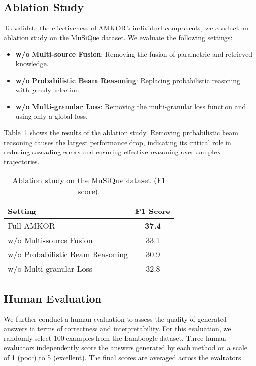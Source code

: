 \subsection{Ablation Study}

To validate the effectiveness of AMKOR's individual components, we conduct an ablation study on the MuSiQue dataset. We evaluate the following settings:
\begin{itemize}
    \item \textbf{w/o Multi-source Fusion}: Removing the fusion of parametric and retrieved knowledge.
    \item \textbf{w/o Probabilistic Beam Reasoning}: Replacing probabilistic reasoning with greedy selection.
    \item \textbf{w/o Multi-granular Loss}: Removing the multi-granular loss function and using only a global loss.
\end{itemize}

Table~\ref{tab:ablation} shows the results of the ablation study. Removing probabilistic beam reasoning causes the largest performance drop, indicating its critical role in reducing cascading errors and ensuring effective reasoning over complex trajectories.

\begin{table}[ht]
\centering
\caption{Ablation study on the MuSiQue dataset (F1 score).}
\label{tab:ablation}
\begin{tabular}{lc}
\toprule
\textbf{Setting} & \textbf{F1 Score} \\
\midrule
Full AMKOR & \textbf{37.4} \\
w/o Multi-source Fusion & 33.1 \\
w/o Probabilistic Beam Reasoning & 30.9 \\
w/o Multi-granular Loss & 32.8 \\
\bottomrule
\end{tabular}
\end{table}

\subsection{Human Evaluation}

We further conduct a human evaluation to assess the quality of generated answers in terms of correctness and interpretability. For this evaluation, we randomly select 100 examples from the Bamboogle dataset. Three human evaluators independently score the answers generated by each method on a scale of 1 (poor) to 5 (excellent). The final scores are averaged across the evaluators.

